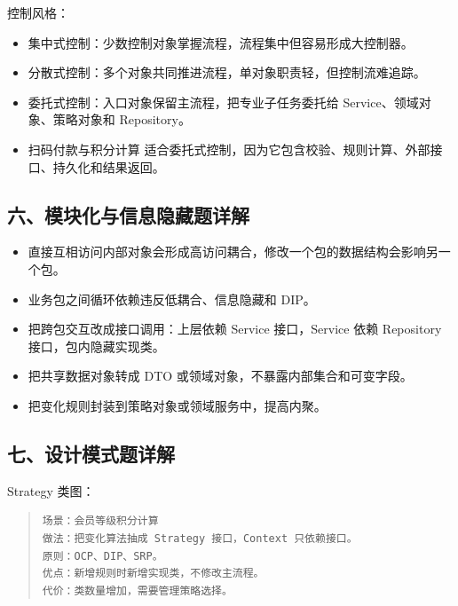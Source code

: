 \documentclass[UTF8,zihao=-4]{ctexart}
\begin{document}



控制风格：


\begin{itemize}
\item 集中式控制：少数控制对象掌握流程，流程集中但容易形成大控制器。
\item 分散式控制：多个对象共同推进流程，单对象职责轻，但控制流难追踪。
\item 委托式控制：入口对象保留主流程，把专业子任务委托给 Service、领域对象、策略对象和 Repository。
\item 扫码付款与积分计算 适合委托式控制，因为它包含校验、规则计算、外部接口、持久化和结果返回。
\end{itemize}



\subsection{六、模块化与信息隐藏题详解}


\begin{itemize}
\item 直接互相访问内部对象会形成高访问耦合，修改一个包的数据结构会影响另一个包。
\item 业务包之间循环依赖违反低耦合、信息隐藏和 DIP。
\item 把跨包交互改成接口调用：上层依赖 Service 接口，Service 依赖 Repository 接口，包内隐藏实现类。
\item 把共享数据对象转成 DTO 或领域对象，不暴露内部集合和可变字段。
\item 把变化规则封装到策略对象或领域服务中，提高内聚。
\end{itemize}



\subsection{七、设计模式题详解}


Strategy 类图：


\begin{quote}
\footnotesize
\begin{verbatim}
场景：会员等级积分计算
做法：把变化算法抽成 Strategy 接口，Context 只依赖接口。
原则：OCP、DIP、SRP。
优点：新增规则时新增实现类，不修改主流程。
代价：类数量增加，需要管理策略选择。
\end{verbatim}
\end{quote}
\end{document}
